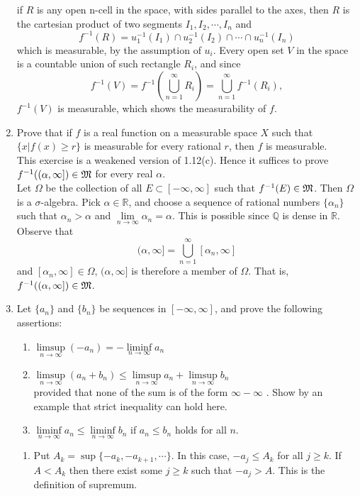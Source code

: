 \documentclass{article}
\begin{document}
\begin{enumerate}
		if $R$ is any open n-cell in the space, with sides parallel to the axes, then $R$ is the cartesian product of two segments $I_1,I_2,\cdots,I_n$ and
		\[
			f^{-1}(R)=u^{-1}_1(I_1)\cap u^{-1}_2(I_2)\cap\cdots\cap u^{-1}_n(I_n)
		\]
		which is measurable, by the assumption of $u_i$. Every open set $V$ in the space is a countable union of such rectangle $R_i$, and since
		\[
			f^{-1}(V)=f^{-1}(\bigcup\limits_{n=1}^{\infty}{R_i})=\bigcup \limits_{n=1}^{\infty}f^{-1}(R_i),
		\]
		$f^{-1}(V)$ is measurable, which shows the measurability of $f$.
	\item \exercise Prove that if $f$ is a real function on a measurable space $X$ such that $\{x|f(x)\geq{r}\}$ is measurable for every rational $r$, then $f$ is measurable.\\
	\solution This exercise is a weakened version of 1.12(c). Hence it suffices to prove $f^{-1}((\alpha,\infty])\in\mathfrak{M}$ for every real $\alpha$.\\
	Let $\Omega$ be the collection of all $E\subset[-\infty,\infty]$ such that $f^{-1}(E)\in\mathfrak{M}$. Then $\Omega$ is a $\sigma$-algebra. Pick $\alpha\in\mathbb{R}$, and choose a sequence of rational numbers $\{\alpha_n\}$ such that $\alpha_n>\alpha$ and $\lim\limits_{n\to\infty}\alpha_n=\alpha$. This is possible since $\mathbb{Q}$ is dense in $\mathbb{R}$. Observe that 
	\[
		(\alpha,\infty]=\bigcup\limits_{n=1}^{\infty}[\alpha_n,\infty]
	\]
	and $[\alpha_n,\infty]\in\Omega$, $(\alpha,\infty]$ is therefore a member of $\Omega$. That is, $f^{-1}((\alpha,\infty])\in\mathfrak{M}$.
	\item \exercise Let $\{a_n\}$ and $\{b_n\}$ be sequences in $[-\infty,\infty]$, and prove the following assertions:
	\begin{enumerate}
		\item $\limsup\limits_{n\to\infty}(-a_n)=-\liminf\limits_{n\to\infty}a_n$
		\item $\limsup\limits_{n\to\infty}(a_n+b_n)\leq\limsup\limits_{n\to\infty}a_n+\limsup\limits_{n\to\infty}b_n$\\
		provided that none of the sum is of the form $\infty-\infty$ . Show by an example that strict inequality can hold here.
		\item $\liminf\limits_{n\to\infty}a_n\leq\liminf\limits_{n\to\infty}b_n$ if $a_n{\leq}b_n$ holds for all $n$.
	\end{enumerate}
	\solution \begin{enumerate}
		\item Put $A_k=\sup\{-a_k,-a_{k+1},\cdots\}$. In this case, $-a_j\leq{A_k}$ for all $j\geq{k}$. If $A<A_k$ then there exist some $j\geq{k}$ such that $-a_j>A$. This is the definition of supremum.\\

\end{enumerate}
\end{enumerate}
\end{document}
